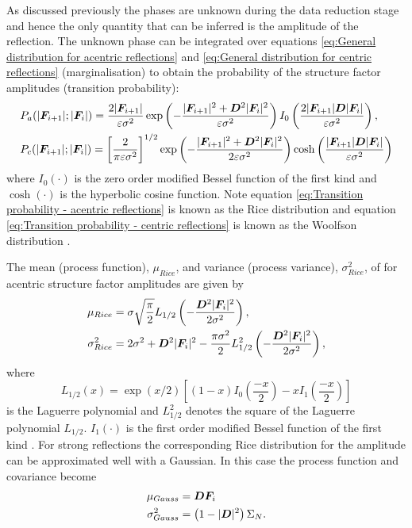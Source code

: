 As discussed previously the phases are unknown during the data reduction stage and hence the only quantity that can be inferred is the amplitude of the reflection.
The unknown phase can be integrated over equations \ref{eq:General distribution for acentric reflections} and \ref{eq:General distribution for centric reflections} (marginalisation) to obtain the probability of the structure factor amplitudes (transition probability):
\begin{align}
    &P_a(|\boldsymbol{F}_{i+1}| ; |\boldsymbol{F}_i|) = \frac{2|\boldsymbol{F}_{i+1}|}{\varepsilon \sigma^2} \exp \left(-\frac{|\boldsymbol{F}_{i+1}|^2 + \boldsymbol{D}^2|\boldsymbol{F}_{i}|^2}{\varepsilon \sigma^2}\right)I_0 \left(\frac{2|\boldsymbol{F}_{i+1}|\boldsymbol{D}|\boldsymbol{F}_{i}|}{\varepsilon \sigma^2}\right), \label{eq:Transition probability - acentric reflections} \\
    &P_c(|\boldsymbol{F}_{i+1}| ; |\boldsymbol{F}_i|) = \left[\frac{2}{\pi \varepsilon \sigma^2}\right]^{1/2} \exp \left(-\frac{|\boldsymbol{F}_{i+1}|^2 + \boldsymbol{D}^2|\boldsymbol{F}_{i}|^2}{2\varepsilon \sigma^2}\right) \cosh \left(\frac{|\boldsymbol{F}_{i+1}|\boldsymbol{D}|\boldsymbol{F}_{i}|}{\varepsilon \sigma^2}\right) \label{eq:Transition probability - centric reflections}
\end{align}
where $I_0(\cdot)$ is the zero order modified Bessel function of the first kind and $\cosh(\cdot)$ is the hyperbolic cosine function.
Note equation \ref{eq:Transition probability - acentric reflections} is known as the Rice distribution and equation \ref{eq:Transition probability - centric reflections} is known as the Woolfson distribution \cite{mccoy2004liking}.

The mean (process function), $\mu_{Rice}$, and variance (process variance), $\sigma_{Rice}^2$, of for acentric structure factor amplitudes are given by
\begin{align}
    \mu_{Rice} &= \sigma \sqrt{\frac{\pi}{2}} L_{1/2} \left(-\frac{\boldsymbol{D}^2|\boldsymbol{F}_i|^2}{2\sigma^2}\right), \label{eq:Process function - mean of rice distribution}\\
    \sigma_{Rice}^2 &= 2\sigma^2 + \boldsymbol{D}^2|\boldsymbol{F}_i|^2 - \frac{\pi \sigma^2}{2} L_{1/2}^2 \left(-\frac{\boldsymbol{D}^2|\boldsymbol{F}_i|^2}{2\sigma^2}\right), \label{eq:Process covariance - variance of rice distribution}
\end{align}
where
\begin{equation}
    L_{1/2}(x) = \exp \left( x/2 \right) \left[ (1-x) I_0 \left( \frac{-x}{2} \right) - xI_1 \left( \frac{-x}{2} \right) \right] \label{eq:Laguerre polynomial}
\end{equation}
is the Laguerre polynomial and $ L_{1/2}^2 $ denotes the square of the Laguerre polynomial $ L_{1/2} $. $I_1(\cdot)$ is the first order modified Bessel function of the first kind \cite{den2014data}.
For strong reflections the corresponding Rice distribution for the amplitude can be approximated well with a Gaussian.
In this case the process function and covariance become
\begin{align}
    \mu_{Gauss} &= \boldsymbol{D}\boldsymbol{F}_i \label{eq:Process covariance - mean of Gaussian distribution}\\
    \sigma_{Gauss}^2 &= \left(1 - |\boldsymbol{D}|^2 \right)\Sigma_N. \label{eq:Process covariance - variance of Gaussian distribution}
\end{align}

